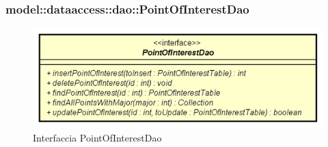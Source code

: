 \documentclass[../DefinizioneDiProdotto.tex]{subfiles}
\begin{document}
\subsubsection{model::dataaccess::dao::PointOfInterestDao}

    \begin{figure}[H]
        \centering
        \includegraphics{img/PointOfInterestDao.png}
        \caption{Interfaccia PointOfInterestDao}\label{fig:model::dataaccess::dao::PointOfInterestDao} 
    \end{figure}
\end{document}
